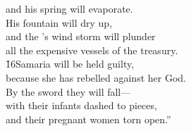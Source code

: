 \begin{poetry}
\poemll    and his spring will evaporate. \\
\poeml His fountain will dry up, \\
\poemll    and the 's wind storm will plunder \\
\poemlll       all the expensive vessels of the treasury. \\
\poeml \v{16}Samaria will be held guilty, \\
\poemll    because she has rebelled against her God. \\
\poeml By the sword they will fall--- \\
\poemll    with their infants dashed to pieces, \\
\poemlll       and their pregnant women torn open.''
\end{poetry}

